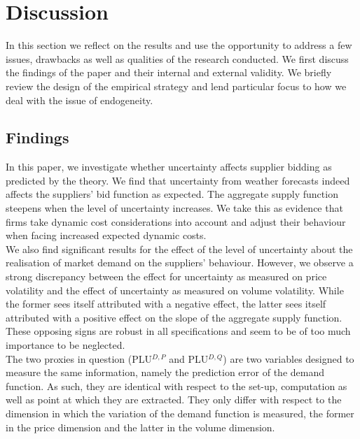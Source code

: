 \section{Discussion }
\label{discussgeneral}
\pagestyle{plain}
In this section we reflect on the results and use the opportunity to address a few issues, drawbacks as well as qualities of the research conducted. We first discuss the findings of the paper and their internal and external validity. We briefly review the design of the empirical strategy and lend particular focus to how we deal with the issue of endogeneity.

\subsection{Findings}\label{findings}
In this paper, we investigate whether uncertainty affects supplier bidding as predicted by the theory. 
We find that uncertainty from weather forecasts indeed affects the suppliers' bid function as expected. The aggregate supply function steepens when the level of uncertainty increases. We take this as evidence that firms take dynamic cost considerations into account and adjust their behaviour when facing increased expected dynamic costs. \\

We also find significant results for the effect of the level of uncertainty about the realisation of market demand on the suppliers' behaviour. However, we observe a strong discrepancy between the effect for uncertainty as measured on price volatility and the effect of uncertainty as measured on volume volatility. While the former sees itself attributed with a negative effect, the latter sees itself attributed with a positive effect on the slope of the aggregate supply function. 
These opposing signs are robust in all specifications and seem to be of too much importance to be neglected. \\

The two proxies in question (PLU$^{D,P}$ and PLU$^{D,Q}$) are two variables designed to measure the same information, namely the prediction error of the demand function.
As such, they are identical with respect to the set-up, computation as well as point at which they are extracted. They only differ with respect to the dimension in which the variation of the demand function  is measured, the former in the price dimension and the latter in the volume dimension. \\

